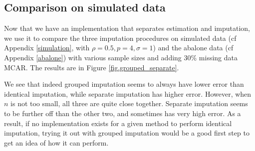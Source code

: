 		\subsection{Comparison on simulated data}
Now that we have an implementation that separates estimation and imputation, we use it to compare the three imputation procedures on simulated data (cf Appendix \ref{simulation}, with $\rho=0.5, p=4, \sigma=1$) and the abalone data (cf Appendix \ref{abalone}) with various sample sizes and adding 30\% missing data MCAR.  The results are in Figure \ref{fig.grouped_separate}.


	
We see that indeed grouped imputation seems to always have lower error than identical imputation, while separate imputation has higher error. However, when $n$ is not too small, all three are quite close together. Separate imputation seems to be further off than the other two, and sometimes has very high error. As a result, if no implementation exists for a given method to perform identical imputation, trying it out with grouped imputation would be a good first step to get an idea of how it can perform.